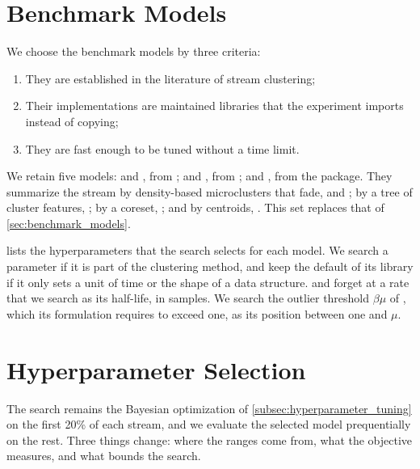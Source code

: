 \section{Benchmark Models}
\label{sec:mod_models}

We choose the benchmark models by three criteria:

\begin{enumerate}
    \item They are established in the literature of stream clustering;
    \item Their implementations are maintained libraries that the experiment imports instead of copying;
    \item They are fast enough to be tuned without a time limit.
\end{enumerate}

We retain five models: \DenStream \cite{cao2006density} and \DBSTREAM \cite{hahsler2016dbstream}, from  \cite{montiel2021river}; \BIRCH \cite{zhang1996birch} and \MiniBatchKMeans \cite{sculley2010webscale}, from  \cite{pedregosa2011scikit}; and \BICO \cite{fichtenberger2013bico}, from the  package. They summarize the stream by density-based microclusters that fade, \DenStream and \DBSTREAM; by a tree of cluster features, \BIRCH; by a coreset, \BICO; and by centroids, \MiniBatchKMeans. This set replaces that of \cref{sec:benchmark_models}.

 lists the hyperparameters that the search selects for each model. We search a parameter if it is part of the clustering method, and keep the default of its library if it only sets a unit of time or the shape of a data structure. \DenStream and \DBSTREAM forget at a rate that we search as its half-life, in samples. We search the outlier threshold $\beta\mu$ of \DenStream, which its formulation requires to exceed one, as its position between one and $\mu$.



\section{Hyperparameter Selection}
\label{sec:mod_selection}

The search remains the Bayesian optimization of \cref{subsec:hyperparameter_tuning} on the first 20\% of each stream, and we evaluate the selected model prequentially on the rest. Three things change: where the ranges come from, what the objective measures, and what bounds the search.

